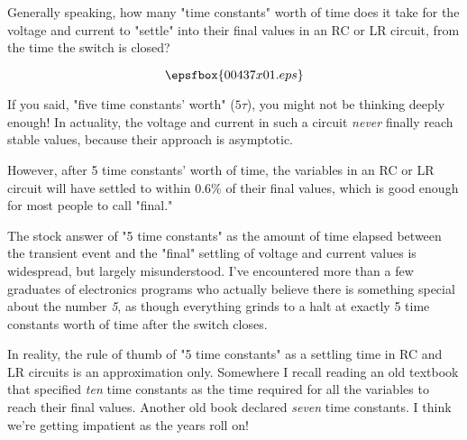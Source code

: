 

Generally speaking, how many "time constants" worth of time does it take for the voltage and current to "settle" into their final values in an RC or LR circuit, from the time the switch is closed?

$$\epsfbox{00437x01.eps}$$







If you said, "five time constants' worth" ($5 \tau$), you might not be thinking deeply enough!  In actuality, the voltage and current in such a circuit {\it never} finally reach stable values, because their approach is asymptotic.

However, after 5 time constants' worth of time, the variables in an RC or LR circuit will have settled to within 0.6\% of their final values, which is good enough for most people to call "final."







The stock answer of "5 time constants" as the amount of time elapsed between the transient event and the "final" settling of voltage and current values is widespread, but largely misunderstood.  I've encountered more than a few graduates of electronics programs who actually believe there is something special about the number {\it 5}, as though everything grinds to a halt at exactly 5 time constants worth of time after the switch closes.

In reality, the rule of thumb of "5 time constants" as a settling time in RC and LR circuits is an approximation only.  Somewhere I recall reading an old textbook that specified {\it ten} time constants as the time required for all the variables to reach their final values.  Another old book declared {\it seven} time constants.  I think we're getting impatient as the years roll on!




